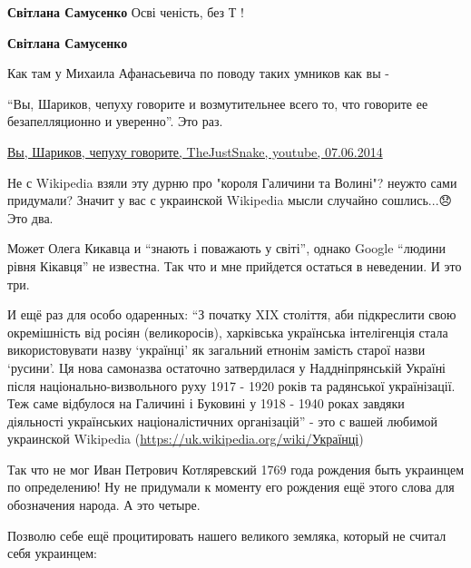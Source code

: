 \begin{itemize}
\begin{itemize}
 
\textbf{Світлана Самусенко} Осві ченість, без Т !

 
\textbf{Світлана Самусенко} 

Как там у Михаила Афанасьевича по поводу таких умников как вы -

\enquote{Вы, Шариков, чепуху говорите и возмутительнее всего то, что говорите
ее безапелляционно и уверенно}. Это раз.

\href{https://youtu.be/zO2il_HLMpk}{%
Вы, Шариков, чепуху говорите, TheJustSnake, youtube, 07.06.2014%
}

Не с Wikipedia взяли эту дурню про "короля Галичини та Волині"? неужто сами
придумали? Значит у вас с украинской Wikipedia мысли случайно сошлись...😞 Это
два.

Может Олега Кикавца и \enquote{знають і поважають у світі}, однако Google \enquote{людини рівня
Кікавця} не известна. Так что и мне прийдется остаться в неведении. И это три.

И ещё раз для особо одаренных: \enquote{З початку XIX століття, аби підкреслити свою
окремішність від росіян (великоросів), харківська українська інтелігенція стала
використовувати назву \enquote{українці} як загальний етнонім замість старої назви
\enquote{русини}. Ця нова самоназва остаточно затвердилася у Наддніпрянській Україні
після національно-визвольного руху 1917 - 1920 років та радянської
українізації. Теж саме відбулося на Галичині і Буковині у 1918 - 1940 роках
завдяки діяльності українських націоналістичних організацій} - это с вашей
любимой украинской Wikipedia
(\url{https://uk.wikipedia.org/wiki/Українці})

Так что не мог Иван Петрович Котляревский 1769 года рождения быть украинцем по
определению! Ну не придумали к моменту его рождения ещё этого слова для
обозначения народа. А это четыре.

Позволю себе ещё процитировать нашего великого земляка, который не считал себя украинцем:


\end{itemize}
\end{itemize}

